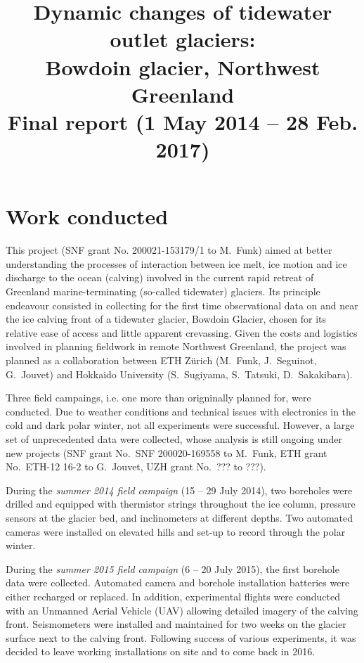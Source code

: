 \documentclass{article}
\title{Dynamic changes of tidewater outlet glaciers:\\
       Bowdoin glacier, Northwest Greenland\\\bigskip
       \large Final report (1 May 2014 -- 28 Feb. 2017)}
\author{}
\date{}
\begin{document}

\maketitle

\section{Work conducted}

This project (SNF grant No. 200021-153179/1 to M.~Funk) aimed at better
understanding the processes of interaction between ice melt, ice motion and ice
discharge to the ocean (calving) involved in the current rapid retreat of
Greenland marine-terminating (so-called tidewater) glaciers. Its principle
endeavour consisted in collecting for the first time observational data on and
near the ice calving front of a tidewater glacier, Bowdoin Glacier, chosen for
its relative ease of access and little apparent crevassing. Given the costs and
logistics involved in planning fieldwork in remote Northwest Greenland, the
project was planned as a collaboration between ETH Zürich (M.~Funk,
J.~Seguinot, G.~Jouvet) and Hokkaido University (S.~Sugiyama, S.~Tatsuki,
D.~Sakakibara).

Three field campaings, i.e. one more than origninally planned for, were
conducted. Due to weather conditions and technical issues with electronics in
the cold and dark polar winter, not all experiments were successful. However, a
large set of unprecedented data were collected, whose analysis is still ongoing
under new projects (SNF grant No.~SNF 200020-169558 to M.~Funk, ETH grant
No.~ETH-12 16-2 to G.~Jouvet, UZH grant No.~??? to ???).

During the \emph{summer 2014 field campaign} (15 -- 29 July 2014), two
boreholes were drilled and equipped with thermistor strings throughout the ice
column, pressure sensors at the glacier bed, and inclinometers at different
depths. Two automated cameras were installed on elevated hills and set-up to
record through the polar winter.

During the \emph{summer 2015 field campaign} (6 -- 20 July 2015), the first
borehole data were collected. Automated camera and borehole installation
batteries were either recharged or replaced. In addition, experimental flights
were conducted with an Unmanned Aerial Vehicle (UAV) allowing detailed imagery
of the calving front. Seismometers were installed and maintained for two weeks
on the glacier surface next to the calving front. Following success of various
experiments, it was decided to leave working installations on site and to come
back in 2016.
\end{document}
